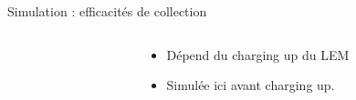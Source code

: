 \begin{frame}{Simulation : efficacités de collection}
\begin{columns}
\begin{column}{0.5\textwidth}
\begin{scriptsize}
                \end{scriptsize}
            \end{column}\hfill
            \begin{column}{0.5\textwidth}
              \begin{scriptsize}
                \begin{itemize}
                    \item Dépend du charging up du LEM
                    \item Simulée ici avant charging up.
                \end{itemize}
              \end{scriptsize}
            \end{column}
        \end{columns}
    \end{frame}
    

